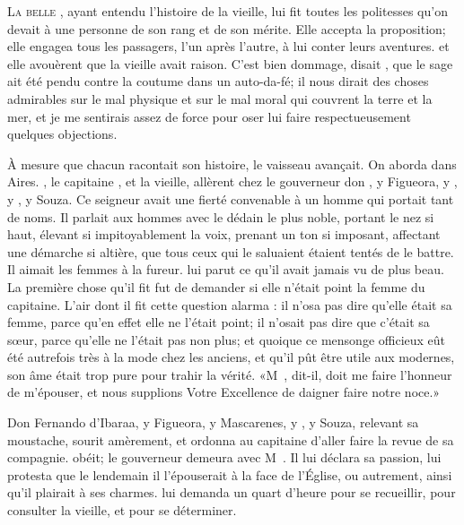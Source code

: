 \lettrine{L}{a belle} , ayant entendu l’histoire de la vieille, lui fit
toutes les politesses qu’on devait à une personne de son rang et de son
mérite. Elle accepta la proposition; elle engagea tous les passagers,
l’un après l’autre, à lui conter leurs aventures.  et elle
avouèrent que la vieille avait raison. C’est bien dommage, disait
, que le sage  ait été pendu contre la coutume dans un
auto-da-fé; il nous dirait des choses admirables sur le mal physique et
sur le mal moral qui couvrent la terre et la mer, et je me sentirais
assez de force pour oser lui faire respectueusement quelques
objections.

À mesure que chacun racontait son histoire, le vaisseau avançait. On
aborda dans  Aires. , le capitaine , et la
vieille, allèrent chez le gouverneur don  , y Figueora,
y , y , y Souza. Ce seigneur avait une fierté
convenable à un homme qui portait tant de noms. Il parlait aux hommes
avec le dédain le plus noble, portant le nez si haut, élevant si
impitoyablement la voix, prenant un ton si imposant, affectant une
démarche si altière, que tous ceux qui le saluaient étaient tentés de
le battre. Il aimait les femmes à la fureur.  lui parut ce
qu’il avait jamais vu de plus beau. La première chose qu’il fit fut de
demander si elle n’était point la femme du capitaine. L’air dont il fit
cette question alarma : il n’osa pas dire qu’elle était sa
femme, parce qu’en effet elle ne l’était point; il n’osait pas dire que
c’était sa sœur, parce qu’elle ne l’était pas non plus; et quoique ce
mensonge officieux eût été autrefois très à la mode chez les
anciens, et qu’il pût être utile aux modernes, son âme était trop
pure pour trahir la vérité. «M~, dit-il, doit me
faire l’honneur de m’épouser, et nous supplions Votre Excellence de
daigner faire notre noce.»

Don Fernando d’Ibaraa, y Figueora, y Mascarenes, y , y Souza,
relevant sa moustache, sourit amèrement, et ordonna au \mbox{capitaine}
 d’aller faire la revue de sa compagnie.  obéit; le
gouverneur demeura avec M~. Il lui déclara sa
passion, lui protesta que le lendemain il l’épouserait à la face de
l’Église, ou autrement, ainsi qu’il plairait à ses charmes. 
lui demanda un quart d’heure pour se recueillir, pour consulter la
vieille, et pour se déterminer.

